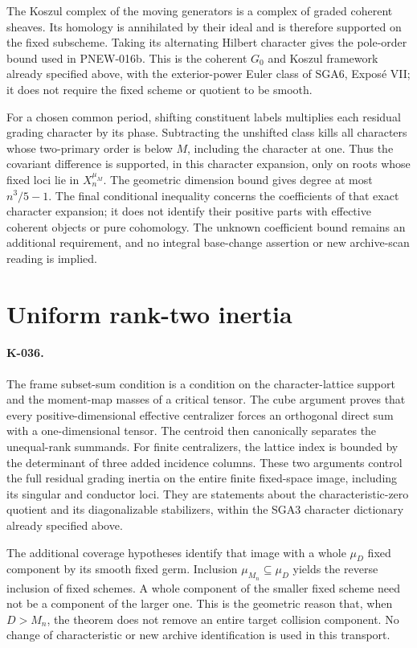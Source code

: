 The Koszul complex of the moving generators is a complex of graded
coherent sheaves. Its homology is annihilated by their ideal and is
therefore supported on the fixed subscheme. Taking its alternating
Hilbert character gives the pole-order bound used in PNEW-016b.
This is the coherent $G_0$ and Koszul framework already specified
above, with the exterior-power Euler class of SGA6, Expos\'e VII;
it does not require the fixed scheme or quotient to be smooth.

For a chosen common period, shifting constituent labels multiplies
each residual grading character by its phase. Subtracting the
unshifted class kills all characters whose two-primary order is
below $M$, including the character at one. Thus the covariant
difference is supported, in this character expansion, only on roots
whose fixed loci lie in $X_n^{\mu_M}$. The geometric dimension bound
gives degree at most $n^3/5-1$. The final conditional inequality
concerns the coefficients of that exact character expansion; it
does not identify their positive parts with effective coherent
objects or pure cohomology. The unknown coefficient bound remains
an additional requirement, and no integral base-change assertion
or new archive-scan reading is implied.

\section{Uniform rank-two inertia}
\paragraph{K-036.}
The frame subset-sum condition is a condition on the character-lattice
support and the moment-map masses of a critical tensor. The cube
argument proves that every positive-dimensional effective centralizer
forces an orthogonal direct sum with a one-dimensional tensor. The
centroid then canonically separates the unequal-rank summands. For
finite centralizers, the lattice index is bounded by the determinant
of three added incidence columns. These two arguments control the
full residual grading inertia on the entire finite fixed-space image,
including its singular and conductor loci. They are statements about
the characteristic-zero quotient and its diagonalizable stabilizers,
within the SGA3 character dictionary already specified above.

The additional coverage hypotheses identify that image with a whole
$\mu_D$ fixed component by its smooth fixed germ. Inclusion
$\mu_{M_n}\subseteq\mu_D$ yields the reverse inclusion of fixed
schemes. A whole component of the smaller fixed scheme need not be
a component of the larger one. This is the geometric reason that,
when $D>M_n$, the theorem does not remove an entire target collision
component. No change of characteristic or new archive identification
is used in this transport.

